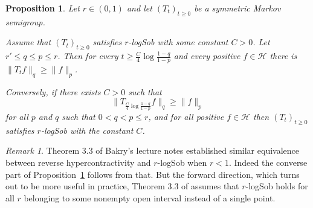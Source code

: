 \documentclass[11pt]{amsart}
\newcommand{\1}{\mathbf{1}}
\def\H{{\mathcal{H}}}
\theoremstyle{definition}
\theoremstyle{plain}
\newtheorem{proposition}[example]{Proposition}
\theoremstyle{remark}
\newtheorem{remark}[example]{Remark}
\numberwithin{equation}{section}
\begin{document}
\begin{proposition} \label{revhyp}
Let $r \in (0,1)$ and let $(T_{t})_{t \geq 0}$ be a symmetric Markov semigroup.

Assume that $(T_{t})_{t \geq 0}$ satisfies $r$-logSob with some constant $C>0$. Let $r' \leq q \leq p \leq r$.
Then for every
$t \geq \frac{C}{4}\log \frac{1-q}{1-p}$ and every positive
$f \in \H$ there is $\| T_{t}f\|_{q} \geq \| f\|_{p}$.

Conversely, if there exists $C>0$ such that
\begin{equation} \label{assrev}
\| T_{\frac{C}{4}\log \frac{1-q}{1-p}}f\|_{q} \geq
\| f\|_{p}
\end{equation}
for all $p$ and $q$ such that $0<q<p \leq r$, and for all positive $f \in \H$  then $(T_{t})_{t \geq 0}$ satisfies
$r$-logSob with the constant $C$.
\end{proposition}
\begin{remark}
Theorem 3.3 of Bakry's lecture notes \cite{Bakry:94} established similar equivalence between reverse hypercontractivity and $r$-logSob when $r<1$. Indeed the converse part of Proposition~\ref{revhyp} follows from that. But the forward direction, which turns out to be more useful in practice, Theorem 3.3 of \cite{Bakry:94} assumes that $r$-logSob holds for all $r$ belonging to some nonempty open interval instead of a single point.
\end{remark}
\end{document}
